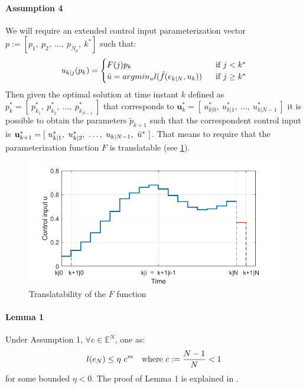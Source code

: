 \paragraph{Assumption 4} We will require an extended control input parameterization vector $p:=[p_1,\ p_2,\ \dots,\ p_{N_p},\ k^*]$ such that: 
\begin{equation*}
\begin{split}
    u_{k|j}(p_k)=
        \begin{cases}
            F(j){p_k}\ \ \ \ \   &\textnormal{if } j<k^* \\
            \Bar{u}=argmin_u l(\hat{f}(e_{k|N},u_k))\ \ &\textnormal{if } j\ge k^*
        \end{cases}
    \end{split}
\end{equation*} 
Then given the optimal solution at time instant $k$ defined as $p_k^*=[\ p_{k_1}^*,\ p_{k_2}^*,\  \dots,\  p_{k_{N-1}}^*\ ]$ that corresponds to $  \textbf{u}_k^*=[\ u_{k|0}^*,\ u_{k|1}^*,\  \dots,\  u_{k|{N-1}}^*\ ]$ it is possible to obtain the parameters $\tilde{p}_{k+1}$ such that the correspondent control input is $  \textbf{u}_{k+1}^*=[\ u_{k|1}^*,\ u_{k|2}^*,\  \dots,\  u_{k|{N-1}},\ \Bar{u}^* \ ]$.
That means to require that the parameterization function $F$ is translatable (see \ref{param_translatability}). \\
\begin{figure}[h!]
	\centering
	\includegraphics[scale=0.4]{IMMAGINI/trans_u}
	\caption{Translatability of the $F$ function}
	\label{param_translatability}
\end{figure}

\paragraph{Lemma 1} Under Assumption 1, $\forall e \in \mathbb{E}^N$, one as:
\begin{equation}
	l(e_N) \leq \eta\ c^m\ \ \  \textnormal{where    } c:=\frac{N-1}{N} < 1
 	\label{lemma1}
\end{equation}
for some bounded $\eta < 0$. The proof of Lemma 1 is explained in \cite{alamir2018stability}. \\



